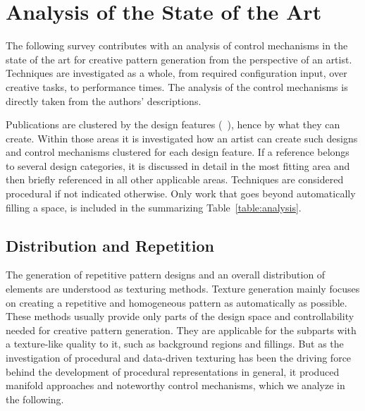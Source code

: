 

\section{Analysis of the State of the Art}
\label{sec:analysis}

The following survey contributes with an analysis of control mechanisms in the state of the art for creative pattern generation from the perspective of an artist. Techniques are investigated as a whole, from required configuration input, over creative tasks, to performance times. The analysis of the control mechanisms is directly taken from the authors' descriptions. 

Publications are clustered by the design features (~), hence by what they can create. Within those areas it is investigated how an artist can create such designs and control mechanisms clustered for each design feature. If a reference belongs to several design categories, it is discussed in detail in the most fitting area and then briefly referenced in all other applicable areas. Techniques are considered procedural if not indicated otherwise. Only work that goes beyond automatically filling a space, is included in the summarizing Table~\ref{table:analysis}.





\subsection{Distribution and Repetition}
\label{subsec:analysis_distribution_and_repetition}

The generation of repetitive pattern designs and an overall distribution of elements are understood as texturing methods. Texture generation mainly focuses on creating a repetitive and homogeneous pattern as automatically as possible. These methods usually provide only parts of the design space and controllability needed for creative pattern generation. They are applicable for the subparts with a texture-like quality to it, such as background regions and fillings. But as the investigation of procedural and data-driven texturing has been the driving force behind the development of procedural representations in general, it produced manifold approaches and noteworthy control mechanisms, which we analyze in the following.


